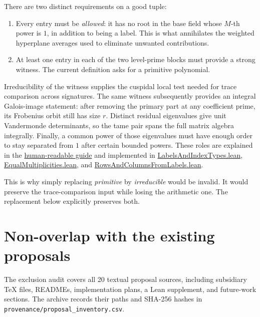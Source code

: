 \documentclass[11pt,a4paper]{article}
\theoremstyle{definition}
\theoremstyle{remark}
\newcommand{\code}[1]{{\small\nolinkurl{#1}}}
\newcommand{\src}[2]{\href{https://github.com/VladimirReshetnikov/ProveIt/blob/89d12dd40424f1217fd818d84877b3da52396a3b/Analysis/GeneralizedRiemannHypothesis/Lean/grh/src/#1.lean}{#2}}
\newcommand{\guide}{\href{https://github.com/VladimirReshetnikov/ProveIt/blob/89d12dd40424f1217fd818d84877b3da52396a3b/Analysis/GeneralizedRiemannHypothesis/docs/guide/theta_lifts_and_dirichlet_zeros.tex}{human-readable guide}}
\begin{document}
There are two distinct requirements on a good tuple:

\begin{enumerate}
\item Every entry must be \emph{allowed}: it has no root in the base field whose
\(M\)-th power is \(1\), in addition to being a label. This is what annihilates the
weighted hyperplane averages used to eliminate unwanted contributions.
\item At least one entry in each of the two level-prime blocks must provide a
strong witness. The current definition asks for a primitive polynomial.
\end{enumerate}

Irreducibility of the witness supplies the cuspidal local test needed for trace
comparison across signatures. The same witness subsequently provides an integral
Galois-image statement: after removing the primary part at any coefficient
prime, its Frobenius orbit still has size \(r\). Distinct residual eigenvalues give
unit Vandermonde determinants, so the tame pair spans the full matrix algebra
integrally. Finally, a common power of those eigenvalues must have enough order
to stay separated from \(1\) after certain bounded powers.
These roles are explained in the \guide{} and implemented in
\src{New/UpperBound/Objects/LabelsAndIndexTypes}{LabelsAndIndexTypes.lean},
\src{New/Spanning/Multiplicities/EqualMultiplicities}{EqualMultiplicities.lean},
and \src{New/Congruences/GaloisRepresentations/RowsAndColumnsFromLabels}{RowsAndColumnsFromLabels.lean}.

This is why simply replacing \emph{primitive} by \emph{irreducible} would be invalid.
It would preserve the trace-comparison input while losing the arithmetic one.
The replacement below explicitly preserves both.

\section{Non-overlap with the existing proposals}

The exclusion audit covers all 20 textual proposal sources, including subsidiary
TeX files, READMEs, implementation plans, a Lean supplement, and future-work sections.
The archive records their paths and SHA-256 hashes in
\code{provenance/proposal_inventory.csv}.
\end{document}
